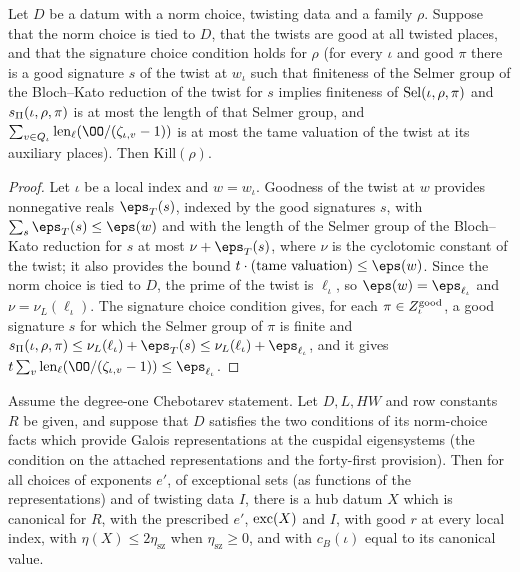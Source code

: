 \begin{lemma}\label{pf:linkN-sel:kill}
Let $D$ be a datum with a norm choice, twisting data and a family $\rho$. Suppose that the norm choice is tied to $D$, that the twists
are good at all twisted places, and that the signature choice condition holds for $\rho$ (for every $\iota$ and good $\pi$ there is a good
signature $s$ of the twist at $w_\iota$ such that finiteness of the Selmer group of the Bloch--Kato reduction of the twist for $s$ implies
finiteness of $\operatorname{Sel}(\iota,\rho,\pi)$ and $s_{\Pi}(\iota,\rho,\pi)$ is at most the length of that Selmer group, and
$\sum_{v\in Q_\iota}\linkNsellen(\OO/(\zeta_{\iota,v}-1))$ is at most the tame valuation of the twist at its auxiliary places). Then
$\mathrm{Kill}(\rho)$.
\end{lemma}

\begin{proof}
Let $\iota$ be a local index and $w=w_\iota$. Goodness of the twist at $w$ provides nonnegative reals $\eps_T(s)$, indexed by the good
signatures $s$, with $\sum_s\eps_T(s)\le\eps(w)$ and with the length of the Selmer group of the Bloch--Kato reduction for $s$ at most
$\nu+\eps_T(s)$, where $\nu$ is the cyclotomic constant of the twist; it also provides the bound $t\cdot(\text{tame valuation})\le\eps(w)$.
Since the norm choice is tied to $D$, the prime of the twist is $\ell_\iota$, so $\eps(w)=\eps_{\ell_\iota}$ and $\nu=\nu_L(\ell_\iota)$. The
signature choice condition gives, for each $\pi\in Z^{\mathrm{good}}_\iota$, a good signature $s$ for which the Selmer group of $\pi$ is finite and
$\linkNselsP(\iota,\rho,\pi)\le\nu_L(\ell_\iota)+\eps_T(s)\le\nu_L(\ell_\iota)+\eps_{\ell_\iota}$, and it gives
$t\sum_v\linkNsellen(\OO/(\zeta_{\iota,v}-1))\le\eps_{\ell_\iota}$.
\end{proof}

\begin{lemma}\label{pf:linkN-sel:canon}
Assume the degree-one Chebotarev statement. Let $D,L,HW$ and row constants $R$ be given, and suppose that $D$ satisfies the two
conditions of its norm-choice facts which provide Galois representations at the cuspidal eigensystems (the condition on the
attached representations and the forty-first provision). Then for all choices of exponents $e'$, of exceptional sets (as functions of the
representations) and of twisting data $I$, there is a hub datum $X$ which is canonical for $R$, with the prescribed $e'$,
$\mathrm{exc}(X)$ and $I$, with good $r$ at every local index, with $\eta(X)\le2\eta_{\mathrm{sz}}$ when $\eta_{\mathrm{sz}}\ge0$, and with
$c_B(\iota)$ equal to its canonical value.
\end{lemma}

